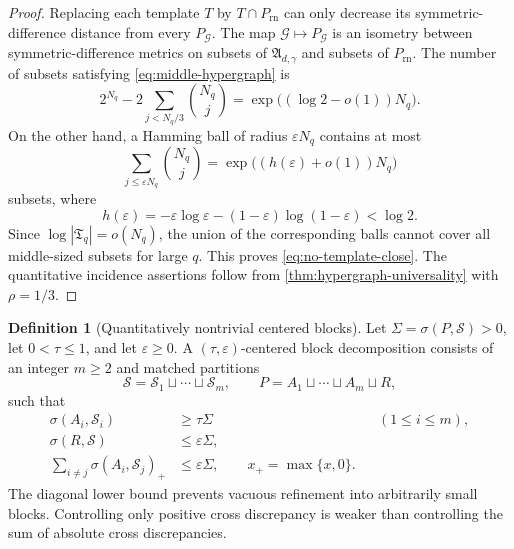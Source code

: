 \documentclass[11pt,letterpaper]{amsart}
\theoremstyle{definition}
\newtheorem{definition}[definition]{Definition}
\theoremstyle{remark}
\newcommand{\1}{\mathbf 1}
\begin{document}
\begin{proof}
Replacing each template $T$ by $T\cap P_{\mathrm{rn}}$ can only decrease its symmetric-difference distance from every $P_{\mathcal G}$.  The map $\mathcal G\mapsto P_{\mathcal G}$ is an isometry between symmetric-difference metrics on subsets of $\mathfrak A_{d,\gamma}$ and subsets of $P_{\mathrm{rn}}$.  The number of subsets satisfying \eqref{eq:middle-hypergraph} is
\[
 2^{N_q}-2\sum_{j<N_q/3}\binom{N_q}{j}
 =\exp\bigl((\log2-o(1))N_q\bigr).
\]
On the other hand, a Hamming ball of radius $\varepsilon N_q$ contains at most
\[
 \sum_{j\le\varepsilon N_q}\binom{N_q}{j}
 =\exp\bigl((h(\varepsilon)+o(1))N_q\bigr)
\]
subsets, where
\[
 h(\varepsilon)=-\varepsilon\log\varepsilon-(1-\varepsilon)\log(1-\varepsilon)<\log2.
\]
Since $\log|\mathfrak T_q|=o(N_q)$, the union of the corresponding balls cannot cover all middle-sized subsets for large $q$.  This proves \eqref{eq:no-template-close}.  The quantitative incidence assertions follow from \cref{thm:hypergraph-universality} with $\rho=1/3$.
\end{proof}


\begin{definition}[Quantitatively nontrivial centered blocks]\label{def:centered-blocks}
Let $\Sigma=\sigma(P,\mathcal S)>0$, let $0<\tau\le1$, and let $\varepsilon\ge0$.  A $(\tau,\varepsilon)$-centered block decomposition consists of an integer $m\ge2$ and matched partitions
\[
 \mathcal S=\mathcal S_1\sqcup\cdots\sqcup\mathcal S_m,
 \qquad
 P=A_1\sqcup\cdots\sqcup A_m\sqcup R,
\]
such that
\begin{align}
 \sigma(A_i,\mathcal S_i)&\ge\tau\Sigma
 &&(1\le i\le m),\label{eq:block-diagonal}\\
 \sigma(R,\mathcal S)&\le\varepsilon\Sigma,\label{eq:block-remainder}\\
 \sum_{i\ne j}\sigma(A_i,\mathcal S_j)_+&\le\varepsilon\Sigma,
 \qquad x_+=\max\{x,0\}.\label{eq:block-cross}
\end{align}
The diagonal lower bound prevents vacuous refinement into arbitrarily small blocks.  Controlling only positive cross discrepancy is weaker than controlling the sum of absolute cross discrepancies.
\end{definition}
\end{document}
